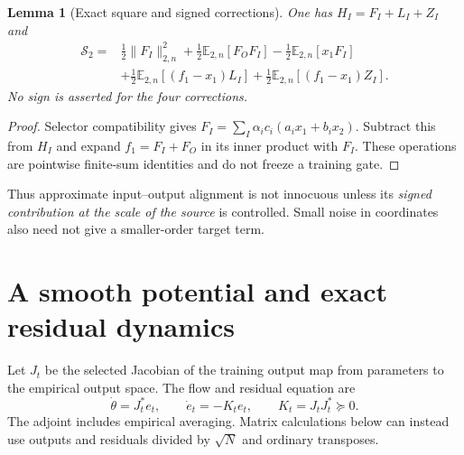 \documentclass[10pt]{article}
\newtheorem{lemma}[theorem]{Lemma}
\newcommand{\E}{\mathbb E}
\begin{document}
\begin{lemma}[Exact square and signed corrections]\label{lem:source}
One has $H_I=F_I+L_I+Z_I$ and
\begin{equation}\label{eq:square}
\begin{split}
\mathcal S_2={}&\tfrac12\|F_I\|_{2,n}^2
 +\tfrac12\E_{2,n}[F_OF_I]-\tfrac12\E_{2,n}[x_1F_I]\\
 &+\tfrac12\E_{2,n}[(f_1-x_1)L_I]
 +\tfrac12\E_{2,n}[(f_1-x_1)Z_I].
\end{split}
\end{equation}
No sign is asserted for the four corrections.
\end{lemma}
\begin{proof}
Selector compatibility gives $F_I=\sum_I\alpha_i c_i(a_ix_1+b_ix_2)$.
Subtract this from $H_I$ and expand $f_1=F_I+F_O$ in its inner product
with $F_I$. These operations are pointwise finite-sum identities and do not
freeze a training gate.
\end{proof}
Thus approximate input--output alignment is not innocuous unless its
\emph{signed contribution at the scale of the source} is controlled. Small
noise in coordinates also need not give a smaller-order target term.

\section{A smooth potential and exact residual dynamics}
Let $J_t$ be the selected Jacobian of the training output map from parameters
to the empirical output space. The flow and residual equation are
\begin{equation}\label{eq:residual}
 \dot\theta=J_t^*e_t,\qquad \dot e_t=-K_te_t,\qquad K_t=J_tJ_t^*\succeq0.
\end{equation}
The adjoint includes empirical averaging. Matrix calculations below can instead
use outputs and residuals divided by $\sqrt N$ and ordinary transposes.
\end{document}
